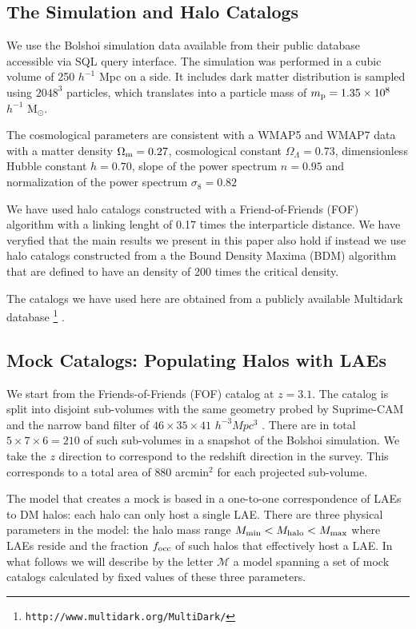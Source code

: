\documentclass{emulateapj}
\begin{document}
\subsection{The Simulation and Halo Catalogs}
We use the Bolshoi simulation data available from their public database accessible via SQL query interface. The simulation was performed in a cubic volume of 250 $h^{-1}$ Mpc on a side. It includes dark matter distribution is sampled using $2048^{3}$ particles, which translates into a particle mass of $m_{\rm p}=1.35\times 10^{8}$ $h^{-1}$ M$_{\odot}$. 

The cosmological parameters are consistent with a WMAP5 and WMAP7 data with a matter density $\Omega_{\rm m} = 0.27$, cosmological constant $\Omega_{\Lambda}=0.73$, dimensionless Hubble constant $h=0.70$, slope of the power spectrum $n=0.95$ and normalization of the power spectrum $\sigma_{8}=0.82$

We have used halo catalogs constructed with a Friend-of-Friends (FOF) algorithm with a linking lenght of 0.17 times the interparticle distance. We have veryfied that the main results we present in this paper also hold if instead we use halo catalogs constructed from a the Bound Density Maxima (BDM) algorithm \citep{KlypinBDM} that are defined to have an density of 200 times the critical density.

The catalogs we have used here are obtained from a publicly available Multidark database \footnote{{\tt http://www.multidark.org/MultiDark/}} \citep{2011arXiv1109.0003R}. 


\subsection{Mock Catalogs: Populating Halos with LAEs}
\label{subsec:mocks}
We start from the Friends-of-Friends (FOF) catalog at $z=3.1$. The catalog is split into disjoint sub-volumes with the same geometry probed by Suprime-CAM and the narrow band filter of $46\times 35\times 41$ $h^{-3}Mpc^{3}$ . There are in total $5\times 7 \times 6=210$ of such sub-volumes in a snapshot of the Bolshoi simulation. We take the $z$ direction to correspond to the redshift direction in the survey. This corresponds to a total area of $880$ arcmin$^{2}$ for each projected sub-volume.

The model that creates a mock is based in a one-to-one correspondence of LAEs to DM halos: each halo can only host a single LAE. There are three physical parameters in the model: the halo mass range $M_{\rm min}< M_{\rm halo} < M_{\rm max}$ where LAEs reside and the fraction $f_{\rm occ}$ of such halos that effectively host a LAE. In what follows we will describe by the letter ${\mathcal M}$ a model spanning a set of mock catalogs calculated by fixed values of these three parameters.
\end{document}

